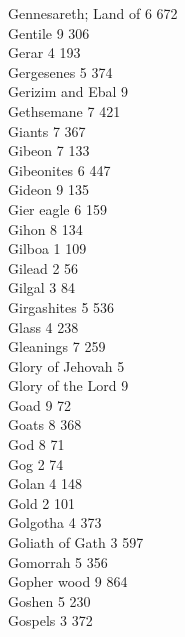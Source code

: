 Gennesareth; Land of \hfill 6 \quad \phantom{0}672\\
Gentile \hfill 9 \quad \phantom{0}306\\
Gerar \hfill 4 \quad \phantom{0}193\\
Gergesenes \hfill 5 \quad \phantom{0}374\\
Gerizim and Ebal \hfill 9 \\
Gethsemane \hfill 7 \quad \phantom{0}421\\
Giants \hfill 7 \quad \phantom{0}367\\
Gibeon \hfill 7 \quad \phantom{0}133\\
Gibeonites \hfill 6 \quad \phantom{0}447\\
Gideon \hfill 9 \quad \phantom{0}135\\
Gier eagle \hfill 6 \quad \phantom{0}159\\
Gihon \hfill 8 \quad \phantom{0}134\\
Gilboa \hfill 1 \quad \phantom{0}109\\
Gilead \hfill 2 \quad \phantom{0}\phantom{0}56\\
Gilgal \hfill 3 \quad \phantom{0}\phantom{0}84\\
Girgashites \hfill 5 \quad \phantom{0}536\\
Glass \hfill 4 \quad \phantom{0}238\\
Gleanings \hfill 7 \quad \phantom{0}259\\
Glory of Jehovah \hfill 5 \\
Glory of the Lord \hfill 9 \\
Goad \hfill 9 \quad \phantom{0}\phantom{0}72\\
Goats \hfill 8 \quad \phantom{0}368\\
God \hfill 8 \quad \phantom{0}\phantom{0}71\\
Gog \hfill 2 \quad \phantom{0}\phantom{0}74\\
Golan \hfill 4 \quad \phantom{0}148\\
Gold \hfill 2 \quad \phantom{0}101\\
Golgotha \hfill 4 \quad \phantom{0}373\\
Goliath of Gath \hfill 3 \quad \phantom{0}597\\
Gomorrah \hfill 5 \quad \phantom{0}356\\
Gopher wood \hfill 9 \quad \phantom{0}864\\
Goshen \hfill 5 \quad \phantom{0}230\\
Gospels \hfill 3 \quad \phantom{0}372\\
